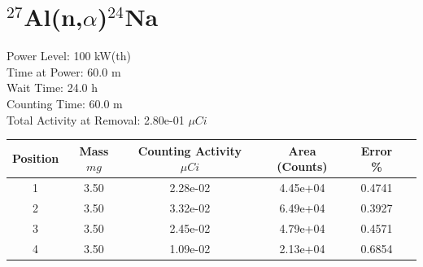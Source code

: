 \newpage

\section*{ $^{27}$Al(n,$\alpha$)$^{24}$Na }

Power Level: 100 kW(th) \\
Time at Power: 60.0 m \\
Wait Time: 24.0 h \\
Counting Time: 60.0 m \\
Total Activity at Removal: 2.80e-01 $\mu Ci$

\begin{table}[h]
\centering
\begin{tabular}{ |c|c|c|c|c|c| }
 \hline
 Position & Mass $mg$ & Counting Activity $\mu Ci$ & Area (Counts) & Error \% \\
 \hline 
 1 & 3.50 & 2.28e-02 & 4.45e+04 & 0.4741 \\ 
\hline
 2 & 3.50 & 3.32e-02 & 6.49e+04 & 0.3927 \\ 
\hline
 3 & 3.50 & 2.45e-02 & 4.79e+04 & 0.4571 \\ 
\hline
 4 & 3.50 & 1.09e-02 & 2.13e+04 & 0.6854 \\ 
\hline
\end{tabular}
\end{table}

